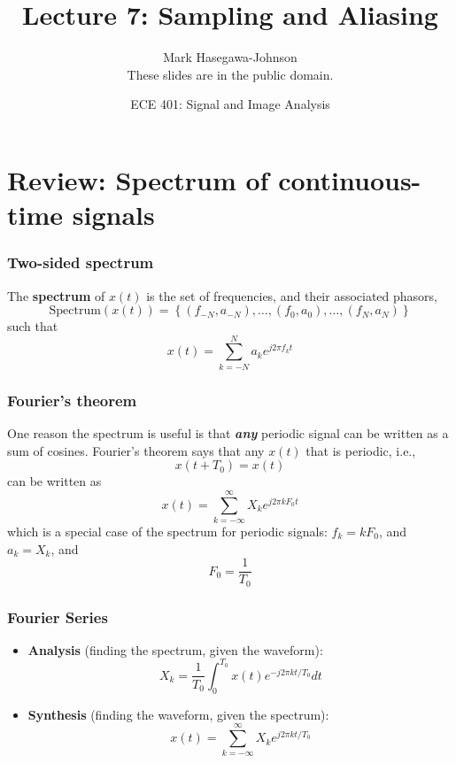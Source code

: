 \documentclass{beamer}
\title{Lecture 7: Sampling and Aliasing}
\author{Mark Hasegawa-Johnson\\These slides are in the public domain.}
\date{ECE 401: Signal and Image Analysis}
\begin{document}
\begin{frame}
  \maketitle
\end{frame}

\begin{frame}
  \tableofcontents
\end{frame}

\section[Review]{Review: Spectrum of continuous-time signals}
\setcounter{subsection}{1}

\begin{frame}
  \frametitle{Two-sided spectrum}

  The {\bf spectrum} of $x(t)$ is the set of frequencies, and their
  associated phasors,
  \[
  \mbox{Spectrum}\left( x(t) \right) =
  \left\{ (f_{-N},a_{-N}), \ldots, (f_0,a_0), \ldots, (f_N,a_N) \right\}
  \]
  such that
  \[
  x(t) = \sum_{k=-N}^N a_ke^{j2\pi f_kt}
  \]
\end{frame}

\begin{frame}
  \frametitle{Fourier's theorem}

  One reason the spectrum is useful is that {\bf\em any} periodic
  signal can be written as a sum of cosines.  Fourier's theorem says that
  any $x(t)$ that is periodic, i.e.,
  \[
  x(t+T_0) = x(t)
  \]
  can be written as
  \[
  x(t) = \sum_{k=-\infty}^\infty X_k e^{j2\pi k F_0 t}
  \]
  which is a special case of the spectrum for periodic signals:
  $f_k=kF_0$, and $a_k=X_k$, and
  \[
  F_0 = \frac{1}{T_0}
  \]
\end{frame}

\begin{frame}
  \frametitle{Fourier Series}

  \begin{itemize}
  \item {\bf Analysis}  (finding the spectrum, given the waveform):
    \[
    X_k = \frac{1}{T_0}\int_0^{T_0} x(t)e^{-j2\pi kt/T_0}dt
    \]
  \item {\bf Synthesis} (finding the waveform, given the spectrum):
    \[
    x(t) = \sum_{k=-\infty}^\infty X_k e^{j2\pi kt/T_0}
    \]
  \end{itemize}
\end{frame}  
\end{document}

